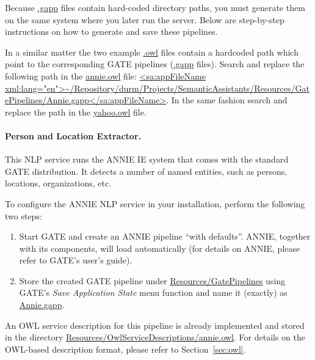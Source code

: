 Because \url{.gapp} files contain hard-coded directory paths, you must
generate them on the same system where you later run the server. Below
are step-by-step instructions on how to generate and save these
pipelines.

In a similar matter the two example \url{.owl} files contain a hardcoded path which point to the corresponding GATE
pipelines (\url{.gapp} files). Search and replace the following path in the \url{annie.owl} file:
\url{<sa:appFileName xml:lang="en">~/Repository/durm/Projects/SemanticAssistants/Resources/GatePipelines/Annie.gapp</sa:appFileName>}.
In the same fashion search and replace the path in the \url{yahoo.owl} file.

\paragraph{Person and Location Extractor.} This NLP service runs the
ANNIE IE system that comes with the standard GATE distribution.  It
detects a number of named entities, such as persons, locations,
organizations, etc.  

To configure the ANNIE NLP service in your installation, perform the
following two steps:
\begin{enumerate}
\item Start GATE and create an ANNIE pipeline ``with defaults''.
  ANNIE, together with its components, will load automatically (for
  details on ANNIE, please refer to GATE's user's guide).

\item Store the created GATE pipeline under
  \url{Resources/GatePipelines} using GATE's \emph{Save Application
    State} menu function and name it (exactly) as \url{Annie.gapp}.
\end{enumerate}
An OWL service description for this pipeline is already implemented
and stored in the directory
\url{Resources/OwlServiceDescriptions/annie.owl}.  For details on the
OWL-based description format, please refer to Section~\ref{sec:owl}.

